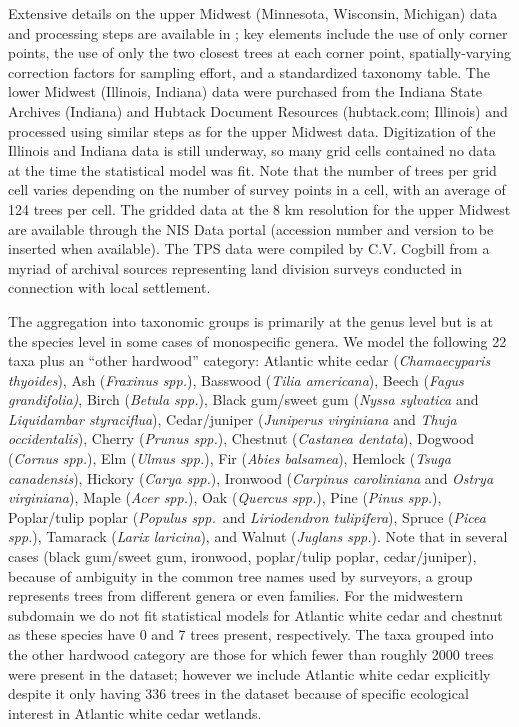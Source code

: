 \documentclass[12pt]{article}
\begin{document}
Extensive details on the upper Midwest (Minnesota, Wisconsin, Michigan)
data and processing steps are available in \cite{goring2015composition};
key elements include the use of only corner points, the use of only
the two closest trees at each corner point, spatially-varying correction
factors for sampling effort, and a standardized taxonomy table. The
lower Midwest (Illinois, Indiana) data were purchased from the Indiana
State Archives (Indiana) and Hubtack Document Resources (hubtack.com;
Illinois) and processed using similar steps as for the upper Midwest
data. Digitization of the Illinois and Indiana data is still underway,
so many grid cells contained no data at the time the statistical model
was fit. Note that the number of trees per grid cell varies depending
on the number of survey points in a cell, with an average of 124 trees
per cell. The gridded data at the 8 km resolution for the upper Midwest
are available through the NIS Data portal (accession number and version
to be inserted when available). The TPS data were compiled by C.V.
Cogbill from a myriad of archival sources representing land division
surveys conducted in connection with local settlement. 

The aggregation into taxonomic groups is primarily at the genus level
but is at the species level in some cases of monospecific genera.
We model the following 22 taxa plus an ``other hardwood'' category:
Atlantic white cedar (\emph{Chamaecyparis thyoides}), Ash (\emph{Fraxinus
spp.}), Basswood (\emph{Tilia americana}), Beech (\emph{Fagus grandifolia)},
Birch (\emph{Betula spp.}), Black gum/sweet gum (\emph{Nyssa sylvatica}
and \emph{Liquidambar styraciflua}), Cedar/juniper (\emph{Juniperus
virginiana} and \emph{Thuja occidentalis}), Cherry (\emph{Prunus spp.}),
Chestnut (\emph{Castanea dentata}), Dogwood (\emph{Cornus spp.}),
Elm (\emph{Ulmus spp.}), Fir (\emph{Abies balsamea}), Hemlock (\emph{Tsuga
canadensis}), Hickory (\emph{Carya spp.}), Ironwood (\emph{Carpinus
caroliniana} and \emph{Ostrya virginiana}), Maple (\emph{Acer spp.}),
Oak (\emph{Quercus spp.}), Pine (\emph{Pinus spp.}), Poplar/tulip
poplar (\emph{Populus spp.}~and \emph{Liriodendron tulipifera}),
Spruce (\emph{Picea spp.}), Tamarack (\emph{Larix laricina}), and
Walnut (\emph{Juglans spp.}). Note that in several cases (black gum/sweet
gum, ironwood, poplar/tulip poplar, cedar/juniper), because of ambiguity
in the common tree names used by surveyors, a group represents trees
from different genera or even families. For the midwestern subdomain
we do not fit statistical models for Atlantic white cedar and chestnut
as these species have 0 and 7 trees present, respectively. The taxa
grouped into the other hardwood category are those for which fewer
than roughly 2000 trees were present in the dataset; however we include
Atlantic white cedar explicitly despite it only having 336 trees in
the dataset because of specific ecological interest in Atlantic white
cedar wetlands. 
\end{document}
